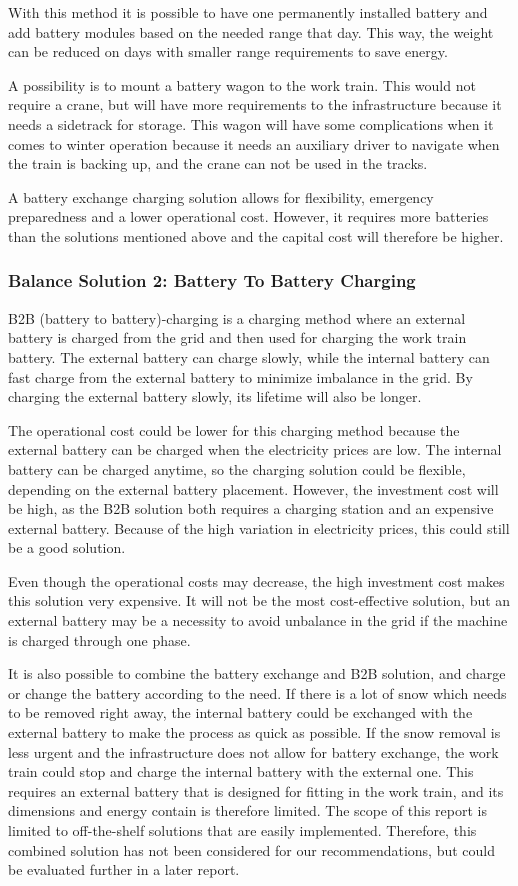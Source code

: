 \documentclass{article}
\begin{document}
With this method it is possible to have one permanently installed battery and add battery modules based on the needed range that day. This way, the weight can be reduced on days with smaller range requirements to save energy.

A possibility is to mount a battery wagon to the work train. This would not require a crane, but will have more requirements to the infrastructure because it needs a sidetrack for storage. This wagon will have some complications when it comes to winter operation because it needs an auxiliary driver to navigate when the train is backing up, and the crane can not be used in the tracks.

A battery exchange charging solution allows for flexibility, emergency preparedness and a lower operational cost. However, it requires more batteries than the solutions mentioned above and the capital cost will therefore be higher.

\subsubsection*{Balance Solution 2: Battery To Battery Charging}

B2B (battery to battery)-charging is a charging method where an external battery is charged from the grid and then used for charging the work train battery. The external battery can charge slowly, while the internal battery can fast charge from the external battery to minimize imbalance in the grid. By charging the external battery slowly, its lifetime will also be longer.

The operational cost could be lower for this charging method because the external battery can be charged when the electricity prices are low. The internal battery can be charged anytime, so the charging solution could be flexible, depending on the external battery placement. However, the investment cost will be high, as the B2B solution both requires a charging station and an expensive external battery. Because of the high variation in electricity prices, this could still be a good solution.

Even though the operational costs may decrease, the high investment cost makes this solution very expensive. It will not be the most cost-effective solution, but an external battery may be a necessity to avoid unbalance in the grid if the machine is charged through one phase.

It is also possible to combine the battery exchange and B2B solution, and charge or change the battery according to the need. If there is a lot of snow which needs to be removed right away, the internal battery could be exchanged with the external battery to make the process as quick as possible. If the snow removal is less urgent and the infrastructure does not allow for battery exchange, the work train could stop and charge the internal battery with the external one. This requires an external battery that is designed for fitting in the work train, and its dimensions and energy contain is therefore limited. The scope of this report is limited to off-the-shelf solutions that are easily implemented. Therefore, this combined solution has not been considered for our recommendations, but could be evaluated further in a later report.
\end{document}
